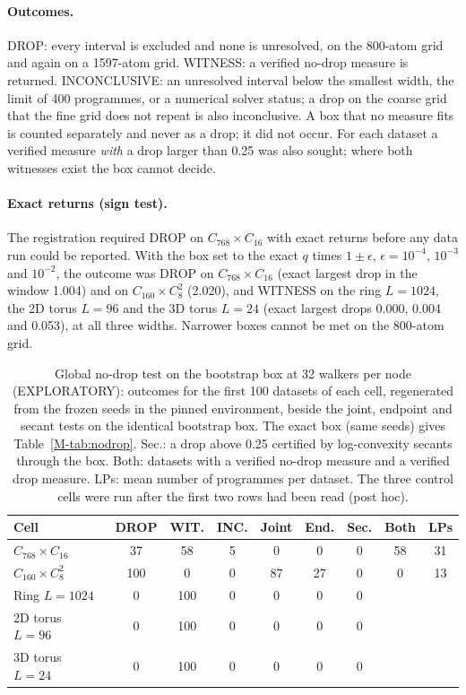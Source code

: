 \documentclass[aps,pre,twocolumn,superscriptaddress,nofootinbib,10pt]{revtex4-2}
\begin{document}
\paragraph*{Outcomes.}
DROP: every interval is excluded and none is unresolved, on the 800-atom grid and again on a 1597-atom grid. WITNESS: a verified no-drop measure is returned. INCONCLUSIVE: an unresolved interval below the smallest width, the limit of 400 programmes, or a numerical solver status; a drop on the coarse grid that the fine grid does not repeat is also inconclusive. A box that no measure fits is counted separately and never as a drop; it did not occur. For each dataset a verified measure \emph{with} a drop larger than 0.25 was also sought; where both witnesses exist the box cannot decide.

\paragraph*{Exact returns (sign test).}
The registration required DROP on $C_{768}\times C_{16}$ with exact returns before any data run could be reported. With the box set to the exact $q$ times $1\pm\epsilon$, $\epsilon=10^{-4}$, $10^{-3}$ and $10^{-2}$, the outcome was DROP on $C_{768}\times C_{16}$ (exact largest drop in the window 1.004) and on $C_{160}\times C_8^2$ (2.020), and WITNESS on the ring $L=1024$, the 2D torus $L=96$ and the 3D torus $L=24$ (exact largest drops 0.000, 0.004 and 0.053), at all three widths. Narrower boxes cannot be met on the 800-atom grid.

\begin{table}[t]
\caption{Global no-drop test on the bootstrap box at 32 walkers per node (EXPLORATORY): outcomes for the first 100 datasets of each cell, regenerated from the frozen seeds in the pinned environment, beside the joint, endpoint and secant tests on the identical bootstrap box. The exact box (same seeds) gives Table~\ref{M-tab:nodrop}. Sec.: a drop above 0.25 certified by log-convexity secants through the box. Both: datasets with a verified no-drop measure and a verified drop measure. LPs: mean number of programmes per dataset. The three control cells were run after the first two rows had been read (post hoc).}
\label{tab:nodropS}
\begin{ruledtabular}
\scriptsize
\setlength{\tabcolsep}{1pt}
\begin{tabular}{lcccccccc}
Cell & DROP & WIT. & INC. & Joint & End. & Sec. & Both & LPs \\
\hline
$C_{768}\times C_{16}$ & 37 & 58 & 5 & 0 & 0 & 0 & 58 & 31 \\
$C_{160}\times C_8^2$ & 100 & 0 & 0 & 87 & 27 & 0 & 0 & 13 \\
Ring $L=1024$ & 0 & 100 & 0 & 0 & 0 & 0 & & \\
2D torus $L=96$ & 0 & 100 & 0 & 0 & 0 & 0 & & \\
3D torus $L=24$ & 0 & 100 & 0 & 0 & 0 & 0 & & \\
\end{tabular}
\end{ruledtabular}
\end{table}
\end{document}
